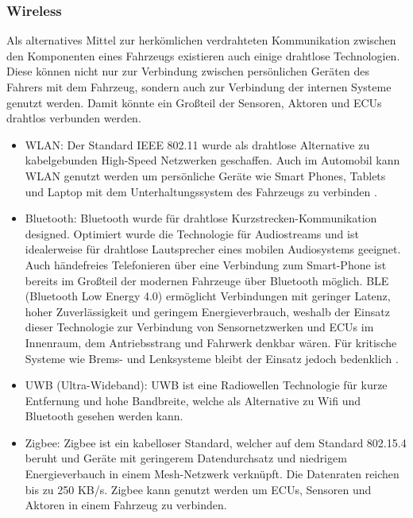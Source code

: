         \subsubsection{Wireless}
        Als alternatives Mittel zur herkömlichen verdrahteten Kommunikation zwischen den Komponenten eines Fahrzeugs existieren auch einige drahtlose Technologien.
        Diese können nicht nur zur Verbindung zwischen persönlichen Geräten des Fahrers mit dem Fahrzeug, sondern auch zur Verbindung der internen Systeme genutzt werden.
        Damit könnte ein Großteil der Sensoren, Aktoren und ECUs drahtlos verbunden werden.
            \begin{itemize}
                \item WLAN: Der Standard IEEE 802.11 wurde als drahtlose Alternative zu kabelgebunden High-Speed
                Netzwerken geschaffen. Auch im Automobil kann WLAN genutzt werden um persönliche Geräte wie Smart Phones,
                Tablets und Laptop mit dem Unterhaltungssystem des Fahrzeugs zu verbinden \cite{IVN}. 
                \item Bluetooth: Bluetooth wurde für drahtlose Kurzstrecken-Kommunikation designed. Optimiert wurde die
                Technologie für Audiostreams und ist idealerweise für drahtlose Lautsprecher eines mobilen Audiosystems geeignet.
                Auch händefreies Telefonieren über eine Verbindung zum Smart-Phone ist bereits im Großteil der modernen Fahrzeuge 
                über Bluetooth möglich. BLE (Bluetooth Low Energy 4.0) ermöglicht Verbindungen mit geringer Latenz, hoher Zuverlässigkeit
                und geringem Energieverbrauch, weshalb der Einsatz dieser Technologie zur Verbindung von Sensornetzwerken und ECUs im Innenraum, 
                dem Antriebsstrang und Fahrwerk denkbar wären. Für kritische Systeme wie Brems- und Lenksysteme bleibt der Einsatz jedoch bedenklich \cite{IVN}.
                \item UWB (Ultra-Wideband): UWB ist eine Radiowellen Technologie für kurze Entfernung und hohe Bandbreite, welche als Alternative zu Wifi und Bluetooth gesehen werden kann.
                \item Zigbee: Zigbee ist ein kabelloser Standard, welcher auf dem Standard 802.15.4 beruht und Geräte mit geringerem Datendurchsatz und niedrigem Energieverbauch in einem 
                Mesh-Netzwerk verknüpft. Die Datenraten reichen bis zu 250 KB/s. Zigbee kann genutzt werden um ECUs, Sensoren und Aktoren in einem Fahrzeug zu verbinden.
            \end{itemize}
